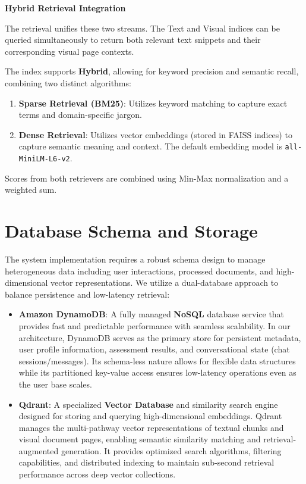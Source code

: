 \textbf{Hybrid Retrieval Integration}

The retrieval unifies these two streams. 
The Text and Visual indices can be queried simultaneously to return both relevant text snippets and their corresponding visual page contexts.

The index supports \textbf{Hybrid}, allowing for keyword precision and semantic recall, combining two distinct algorithms:

\begin{enumerate}
    \item \textbf{Sparse Retrieval (BM25)}: Utilizes keyword matching to capture exact terms and domain-specific jargon.
    \item \textbf{Dense Retrieval}: Utilizes vector embeddings (stored in FAISS indices) to capture semantic meaning and context. The default embedding model is \texttt{all-MiniLM-L6-v2}.
\end{enumerate}

Scores from both retrievers are combined using Min-Max normalization and a weighted sum.



\section{Database Schema and Storage}
The system implementation requires a robust schema design to manage heterogeneous data including user interactions, processed documents, and high-dimensional vector representations. We utilize a dual-database approach to balance persistence and low-latency retrieval:

\begin{itemize}
    \item \textbf{Amazon DynamoDB}: A fully managed \textbf{NoSQL} database service that provides fast and predictable performance with seamless scalability. In our architecture, DynamoDB serves as the primary store for persistent metadata, user profile information, assessment results, and conversational state (chat sessions/messages). Its schema-less nature allows for flexible data structures while its partitioned key-value access ensures low-latency operations even as the user base scales.
    \item \textbf{Qdrant}: A specialized \textbf{Vector Database} and similarity search engine designed for storing and querying high-dimensional embeddings. Qdrant manages the multi-pathway vector representations of textual chunks and visual document pages, enabling semantic similarity matching and retrieval-augmented generation. It provides optimized search algorithms, filtering capabilities, and distributed indexing to maintain sub-second retrieval performance across deep vector collections.
\end{itemize}

